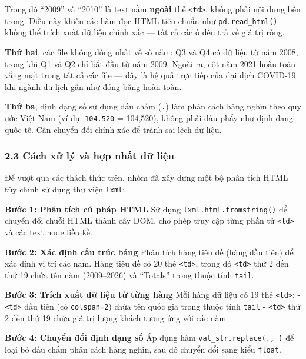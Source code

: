 \documentclass[11pt]{article}
\begin{document}
Trong đó ``2009'' và ``2010'' là text nằm \textbf{ngoài} thẻ
\texttt{\textless{}td\textgreater{}}, không phải nội dung bên trong.
Điều này khiến các hàm đọc HTML tiêu chuẩn như \texttt{pd.read\_html()}
không thể trích xuất dữ liệu chính xác --- tất cả các ô đều trả về giá
trị rỗng.

\textbf{Thứ hai}, các file không đồng nhất về số năm: Q3 và Q4 có dữ
liệu từ năm 2008, trong khi Q1 và Q2 chỉ bắt đầu từ năm 2009. Ngoài ra,
cột năm 2021 hoàn toàn vắng mặt trong tất cả các file --- đây là hệ quả
trực tiếp của đại dịch COVID-19 khi ngành du lịch gần như đóng băng hoàn
toàn.

\textbf{Thứ ba}, định dạng số sử dụng dấu chấm (\texttt{.}) làm phân
cách hàng nghìn theo quy ước Việt Nam (ví dụ: \texttt{104.520} =
104,520), không phải dấu phẩy như định dạng quốc tế. Cần chuyển đổi
chính xác để tránh sai lệch dữ liệu.

\subsubsection{2.3 Cách xử lý và hợp nhất dữ
liệu}\label{cuxe1ch-xux1eed-luxfd-vuxe0-hux1ee3p-nhux1ea5t-dux1eef-liux1ec7u}

Để vượt qua các thách thức trên, nhóm đã xây dựng một bộ phân tích HTML
tùy chỉnh sử dụng thư viện \texttt{lxml}:

\textbf{Bước 1: Phân tích cú pháp HTML} Sử dụng
\texttt{lxml.html.fromstring()} để chuyển đổi chuỗi HTML thành cây DOM,
cho phép truy cập từng phần tử \texttt{\textless{}td\textgreater{}} và
các text node liền kề.

\textbf{Bước 2: Xác định cấu trúc bảng} Phân tích hàng tiêu đề (hàng đầu
tiên) để xác định vị trí các năm. Hàng tiêu đề có 20 thẻ
\texttt{\textless{}td\textgreater{}}, trong đó
\texttt{\textless{}td\textgreater{}} thứ 2 đến thứ 19 chứa tên năm
(2009--2026) và ``Totals'' trong thuộc tính \texttt{tail}.

\textbf{Bước 3: Trích xuất dữ liệu từ từng hàng} Mỗi hàng dữ liệu có 19
thẻ \texttt{\textless{}td\textgreater{}}: -
\texttt{\textless{}td\textgreater{}} đầu tiên (có \texttt{colspan=2})
chứa tên quốc gia trong thuộc tính \texttt{tail} -
\texttt{\textless{}td\textgreater{}} thứ 2 đến thứ 19 chứa giá trị lượng
khách tương ứng với các năm

\textbf{Bước 4: Chuyển đổi định dạng số} Áp dụng hàm
\texttt{val\_str.replace(\textquotesingle{}.\textquotesingle{},\ \textquotesingle{}\textquotesingle{})}
để loại bỏ dấu chấm phân cách hàng nghìn, sau đó chuyển đổi sang kiểu
\texttt{float}.
\end{document}
